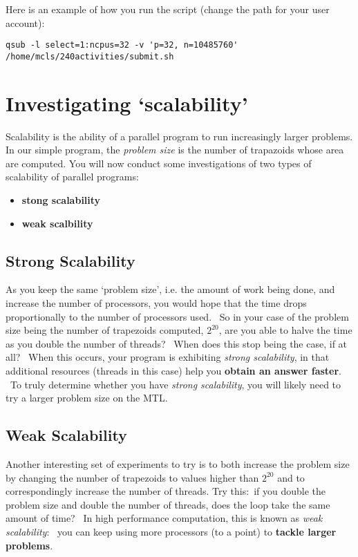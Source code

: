 \documentclass[letterpaper,10pt,openany,oneside]{sphinxmanual}
\begin{document}
Here is an example of how you run the script (change the path for your
user account):

\begin{Verbatim}[commandchars=\\\{\}]
qsub -l select=1:ncpus=32 -v 'p=32, n=10485760'
/home/mcls/240activities/submit.sh
\end{Verbatim}


\section{Investigating ‘scalability’}
\label{timingAndScalability/TimingOnMTLandscalability:investigating-scalability}
Scalability is the ability of a parallel program to run increasingly larger problems.  In our simple program, the \emph{problem size} is the number of trapazoids whose area are computed.  You will now conduct some investigations of two types of scalability of parallel programs:
\begin{itemize}
\item {} 
\textbf{stong scalability}

\item {} 
\textbf{weak scalbility}

\end{itemize}


\subsection{Strong Scalability}
\label{timingAndScalability/TimingOnMTLandscalability:strong-scalability}
As you keep the same ‘problem size’, i.e. the amount of work being done,
and increase the number of processors, you would hope that the time
drops proportionally to the number of processors used.  So in your case
of the problem size being the number of trapezoids computed, $2^{20}$, are
you able to halve the time as you double the number of threads?  When
does this stop being the case, if at all?  When this occurs, your
program is exhibiting \emph{strong scalability}, in that additional resources
(threads in this case) help you \textbf{obtain an answer faster}.  To truly
determine whether you have \emph{strong scalability}, you will likely need to
try a larger problem size on the MTL.


\subsection{Weak Scalability}
\label{timingAndScalability/TimingOnMTLandscalability:weak-scalability}
Another interesting set of experiments to try is to both increase the problem size
by changing the number of trapezoids to values higher than $2^{20}$ and to correspondingly increase the number of threads. Try
this: if you double the problem size and double the number of threads,
does the loop take the same amount of time?  In high performance
computation, this is known as \emph{weak scalability}:  you can keep using more
processors (to a point) to \textbf{tackle larger problems}.
\end{document}
